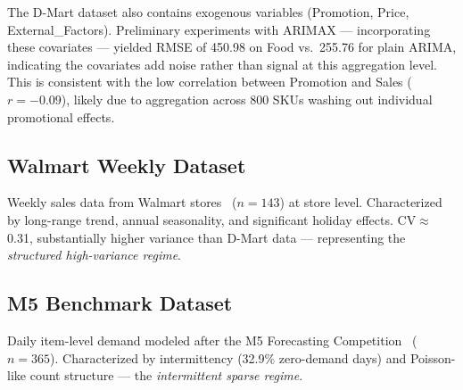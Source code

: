 \documentclass[journal]{IEEEtran}
\begin{document}
\begin{table}[htbp]
\centering
\caption{D-Mart Dataset Characteristics (Category-Level Daily Aggregates)}
\label{tab:dataset_stats}
\end{table}

The D-Mart dataset also contains exogenous variables (Promotion, Price, External\_Factors). Preliminary experiments with ARIMAX — incorporating these covariates — yielded RMSE of 450.98 on Food vs.\ 255.76 for plain ARIMA, indicating the covariates add noise rather than signal at this aggregation level. This is consistent with the low correlation between Promotion and Sales ($r=-0.09$), likely due to aggregation across 800 SKUs washing out individual promotional effects.

\subsection{Walmart Weekly Dataset}

Weekly sales data from Walmart stores~\cite{walmart_kaggle} ($n{=}143$) at store level. Characterized by long-range trend, annual seasonality, and significant holiday effects. CV$\approx$0.31, substantially higher variance than D-Mart data — representing the \emph{structured high-variance regime}.

\subsection{M5 Benchmark Dataset}

Daily item-level demand modeled after the M5 Forecasting Competition~\cite{makridakis2022m5} ($n{=}365$). Characterized by intermittency (32.9\% zero-demand days) and Poisson-like count structure — the \emph{intermittent sparse regime}.
\end{document}
